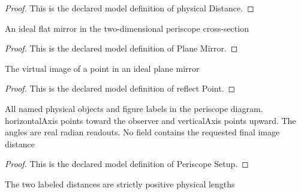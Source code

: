 \begin{proof}
  This is the declared model definition of physical Distance.
\end{proof}
\begin{definition}
  \label{def:physics:phyx-mini-0026:phyxminiproblems-problemphyxmini0026-planemirror}
  An ideal flat mirror in the two-dimensional periscope cross-section
\end{definition}
\begin{proof}
  This is the declared model definition of Plane Mirror.
\end{proof}
\begin{definition}
  \label{def:physics:phyx-mini-0026:phyxminiproblems-problemphyxmini0026-planemirror-reflectpoint}
  The virtual image of a point in an ideal plane mirror
\end{definition}
\begin{proof}
  This is the declared model definition of reflect Point.
\end{proof}
\begin{definition}
  \label{def:physics:phyx-mini-0026:phyxminiproblems-problemphyxmini0026-periscopesetup}
  All named physical objects and figure labels in the periscope diagram. horizontalAxis points toward the observer and verticalAxis points upward. The angles are real radian readouts. No field contains the requested final image distance
\end{definition}
\begin{proof}
  This is the declared model definition of Periscope Setup.
\end{proof}
\begin{definition}
  \label{def:physics:phyx-mini-0026:phyxminiproblems-problemphyxmini0026-haspositivefigurelengths}
  The two labeled distances are strictly positive physical lengths
\end{definition}
